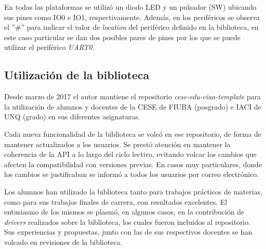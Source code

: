 En todas las plataformas se utilizó un diodo LED y un pulsador (SW) ubicando sus pines como IO0 e IO1, respectivamente. Además, en los periféricos se observa el ''\#'' para indicar el valor de \emph{location} del periférico definido en la biblioteca, en este caso particular se dan dos posibles pares de pines por los que se puede utilizar el periférico \emph{UART0}.


\subsection{Utilización de la biblioteca}
\label{sec:teach}

Desde marzo de 2017 el autor mantiene el repositorio \emph{cese-edu-ciaa-template} \citep{repoCESE} para la utilización de alumnos y docentes de la CESE de FIUBA (posgrado) e IACI de UNQ \citep{IACI} (grado) en sus diferentes asignaturas. 

Cada nueva funcionalidad de la  biblioteca se volcó en ese repositorio, de forma de mantener actualizados a los usuarios. Se prestó atención en mantener la coherencia de la API a lo largo del ciclo lectivo, evitando volcar los cambios que afecten la compatibilidad con versiones previas. En casos muy particulares, donde los cambios se justificaban se informó a todos los usuarios por correo electrónico.

Los alumnos han utilizado la biblioteca tanto para trabajos prácticos de materias, como para sus trabajos finales de carrera, con resultados excelentes. El entusiasmo de los mismos se plasmó, en algunos casos, en la contribución de \emph{drivers} realizados sobre la biblioteca, los cuales fueron incluidos al repositorio. Sus experiencias y propuestas, junto con las de sus respectivos docentes se han volcado en revisiones de la biblioteca.

